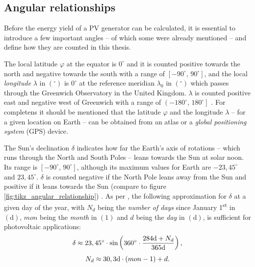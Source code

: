 \subsection{Angular relationships} \label{sec:angular_relationships}
Before the energy yield of a PV generator can be calculated, it is essential to introduce a few important angles -- of which some were already mentioned -- and define how they are counted in this thesis.

The local latitude $\varphi$ at the equator is $0^\circ$ and it is counted positive towards the north and negative towards the south with a range of $\left[-90^\circ \text{, } 90^\circ\right]$, and the local \emph{longitude} $\lambda$ in $\left(^\circ\right)$ is $0^\circ$ at the reference meridian $\lambda_0$ in $\left(^\circ\right)$ which passes through the Greenwich Observatory in the United Kingdom. $\lambda$ is counted positive east and negative west of Greenwich with a range of $\left(-180^\circ \text{, } 180^\circ\right]$ \cite{Landis:1995, Karttunen:2006, Wagner:2018}. For completens it should be mentioned that the latitude $\varphi$ and the longitude $\lambda$ -- for a given location on Earth -- can be obtained from an atlas or a \emph{global positioning system} (GPS) device.

The Sun's declination $\delta$ indicates how far the Earth's axis of rotations -- which runs through the North and South Poles -- leans towards the Sun at solar noon. Its range is $\left[-90^\circ \text{, } 90^\circ\right]$, although its maximum values for Earth are $-23,45^\circ$ and $23,45^\circ$. $\delta$ is counted negative if the North Pole leans away from the Sun and positive if it leans towards the Sun (compare to figure \ref{fig:tikz_angular_relationship}) \cite{Landis:1995, Karttunen:2006, Mertens:2015, Wagner:2018}. As per \cite{Wagner:2018}, the following approximation for $\delta$ at a given day of the year, with $N_d$ being the \emph{number of days} since January 1\textsuperscript{st} in $\left(\mathrm d \right)$,  $mon$ being the \emph{month} in $\left( 1 \right)$ and $d$ being the \emph{day} in $\left(\mathrm d \right)$, is sufficient for photovoltaic applications: 
	\begin{equation} \label{eq:delta}
	\centering
		\delta \approx 23,45^\circ \cdot \sin \left(360^\circ \cdot \frac{284\mathrm{d} + N_d}{365\mathrm{d}}\right) \text{,} 
	\end{equation}
	\begin{equation} \label{eq:delta}
	\centering
		N_d \approx 30,3\mathrm{d} \cdot \left(mon - 1\right) + d \text{.}
	\end{equation}

